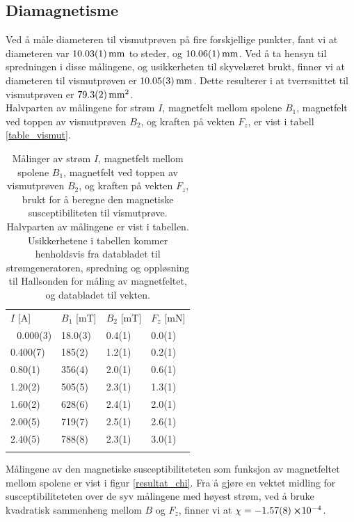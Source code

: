 \documentclass[%
 reprint,
 amsmath,amssymb,
 aps,
 norsk,
]{revtex4-1}
\begin{document}
\subsection{Diamagnetisme}
Ved å måle diameteren til vismutprøven på fire forskjellige punkter, fant vi at diameteren var $\SI{10.03\pm0.01}{\milli\meter}$ to steder, og $\SI{10.06\pm0.01}{\milli\meter}$. Ved å ta hensyn til spredningen i disse målingene, og usikkerheten til skyvelæret brukt, finner vi at diameteren til vismutprøven er $\SI{10.05\pm0.03}{\milli\meter}$. Dette resulterer i at tverrsnittet til vismutprøven er $\SI{79.3\pm0.2}{\milli\meter^2}$.\\
Halvparten av målingene for strøm $I$, magnetfelt mellom spolene $B_1$, magnetfelt ved toppen av vismutprøven $B_2$, og kraften på vekten $F_z$, er vist i tabell \vref{table_vismut}.
\begin{table}
  \centering
  \caption{Målinger av strøm $I$, magnetfelt mellom spolene $B_1$, magnetfelt ved toppen av vismutprøven $B_2$, og kraften på vekten $F_z$, brukt for å beregne den magnetiske susceptibiliteten til vismutprøve. Halvparten av målingene er vist i tabellen. Usikkerhetene i tabellen kommer henholdsvis fra databladet til strømgeneratoren, spredning og oppløsning til Hallsonden for måling av magnetfeltet, og databladet til vekten.}
  \label{table_vismut}
    \begin{tabular}{@{}llll@{}}\botrule
    $I$ {[}A{]} & $B_1$ {[}mT{]} & $B_2$ {[}mT{]} & $F_z$ {[}mN{]} \\ \colrule 
    0.000(3)    & 18.0(3)        & 0.4(1)         & 0.0(1)      \\
    0.400(7)    & 185(2)         & 1.2(1)         & 0.2(1)      \\
    0.80(1)     & 356(4)         & 2.0(1)         & 0.6(1)      \\
    1.20(2)     & 505(5)         & 2.3(1)         & 1.3(1)        \\
    1.60(2)     & 628(6)         & 2.4(1)         & 2.0(1)        \\
    2.00(5)     & 719(7)         & 2.5(1)         & 2.6(1)        \\
    2.40(5)     & 788(8)         & 2.3(1)         & 3.0(1)        \\\botrule
    \end{tabular}
\end{table}
Målingene av den magnetiske susceptibiliteteten som funksjon av magnetfeltet mellom spolene er vist i figur \vref{resultat_chi}. Fra å gjøre en vektet midling for susceptibiliteteten over de syv målingene med høyest strøm, ved å bruke kvadratisk sammenheng mellom $B$ og $F_z$, finner vi at $\chi = -\SI{1.57\pm0.08}\cross 10^{-4}$.
\end{document}
